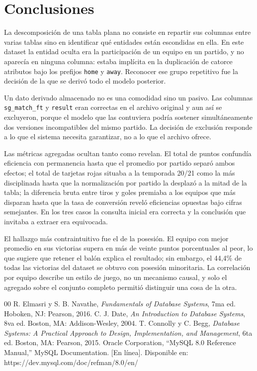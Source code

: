 \documentclass[conference]{IEEEtran}
\begin{document}
\section{Conclusiones}

La descomposición de una tabla plana no consiste en repartir sus columnas entre
varias tablas sino en identificar qué entidades están escondidas en ella. En
este dataset la entidad oculta era la participación de un equipo en un partido,
y no aparecía en ninguna columna: estaba implícita en la duplicación de catorce
atributos bajo los prefijos \texttt{home} y \texttt{away}. Reconocer ese grupo
repetitivo fue la decisión de la que se derivó todo el modelo posterior.

Un dato derivado almacenado no es una comodidad sino un pasivo. Las columnas
\texttt{sg\_match\_ft} y \texttt{result} eran correctas en el archivo original
y aun así se excluyeron, porque el modelo que las contuviera podría sostener
simultáneamente dos versiones incompatibles del mismo partido. La decisión de
exclusión responde a lo que el sistema necesita garantizar, no a lo que el
archivo ofrece.

Las métricas agregadas ocultan tanto como revelan. El total de puntos confundía
eficiencia con permanencia hasta que el promedio por partido separó ambos
efectos; el total de tarjetas rojas situaba a la temporada 20/21 como la más
disciplinada hasta que la normalización por partido la desplazó a la mitad de
la tabla; la diferencia bruta entre tiros y goles premiaba a los equipos que
más disparan hasta que la tasa de conversión reveló eficiencias opuestas bajo
cifras semejantes. En los tres casos la consulta inicial era correcta y la
conclusión que invitaba a extraer era equivocada.

El hallazgo más contraintuitivo fue el de la posesión. El equipo con mejor
promedio en sus victorias supera en más de veinte puntos porcentuales al peor,
lo que sugiere que retener el balón explica el resultado; sin embargo, el
44,4\% de todas las victorias del dataset se obtuvo con posesión minoritaria.
La correlación por equipo describe un estilo de juego, no un mecanismo causal,
y solo el agregado sobre el conjunto completo permitió distinguir una cosa de
la otra.

\begin{thebibliography}{00}
 R. Elmasri y S. B. Navathe, \emph{Fundamentals of Database
Systems}, 7ma ed. Hoboken, NJ: Pearson, 2016.
 C. J. Date, \emph{An Introduction to Database Systems}, 8va ed.
Boston, MA: Addison-Wesley, 2004.
 T. Connolly y C. Begg, \emph{Database Systems: A Practical
Approach to Design, Implementation, and Management}, 6ta ed. Boston, MA:
Pearson, 2015.
 Oracle Corporation, ``MySQL 8.0 Reference Manual,'' MySQL
Documentation. [En línea]. Disponible en: https://dev.mysql.com/doc/refman/8.0/en/
\end{thebibliography}
\end{document}
